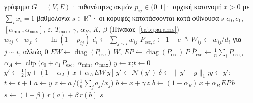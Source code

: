 \documentclass[11pt,a4paper]{article}
\newcommand{\Pesc}{P_{\mathrm{esc}}}
\newcommand{\Pescbar}{\bar{P}_{\mathrm{esc}}}
\newcommand{\N}{\mathcal{N}}
\DeclareMathOperator{\clip}{clip}
\DeclareMathOperator{\diag}{diag}
\begin{document}
\begin{algorithm}[H]
\caption{W1 --- εξομάλυνση διπλού τελεστή με συνδυασμό τάξεων}\label{alg:w1}
\small
\begin{algorithmic}[1]
\Require γράφημα $G=(V,E)$· πιθανότητες ακμών $p_{ij}\in(0,1]$· αρχική κατανομή $x>0$ με $\sum_i x_i=1$
\Ensure βαθμολογία $s\in\mathbb{R}^n$· οι κορυφές κατατάσσονται κατά φθίνουσα $s$
\Params $c_0,c_1$, $[\alpha_{\min},\alpha_{\max}]$, $\varepsilon$, $T_{\max}$, $\gamma$, $\alpha_B$, $K$, $\beta$ (Πίνακας~\ref{tab:params})
  \State $w_{ij}\gets w_{ji}\gets -\ln(1-p_{ij})$\label{line:w} 
\EndFor
{}
  \State $d_i\gets\sum_{j\sim i}w_{ij}$
  \State $P_{\mathrm{esc},i}\gets 1-e^{-d_i}$ 
\EndFor
\State $W_{ij}\gets w_{ij}/d_i$ για $j\sim i$, αλλιώς $0$ 
\State $EW\gets\diag(\Pesc)\,W$, \quad $EP\gets\diag(\Pesc)\,P$ 
\State $\Pescbar\gets\frac1n\sum_iP_{\mathrm{esc},i}$
\State $\alpha_A\gets\clip\big(c_0+c_1\,\Pescbar,\ \alpha_{\min},\ \alpha_{\max}\big)$ 
\State $y\gets x$;\quad $t\gets 0$
\Repeat
  \State $y'\gets\tfrac12\big[\,y+(1-\alpha_A)\,x+\alpha_A\,EW\,y\,\big]$ 
  \State $y'\gets\N(y')$
  \State $\delta\gets\lVert y'-y\rVert_1$;\quad $y\gets y'$;\quad $t\gets t+1$
\State $a\gets y$
\State $z\gets a\,\Big/\Big(\frac1n\sum_j a_j/x_j\Big)$\label{line:z} 
\State $b\gets x+\gamma\,z$ 
  \State $b\gets(1-\alpha_B)\,x+\alpha_B\,EP\,b$ 
\EndFor
{}
\State $s\gets(1-\beta)\,r(a)+\beta\,r(b)$
\State \Return $s$
\end{algorithmic}
\end{algorithm}
\end{document}
